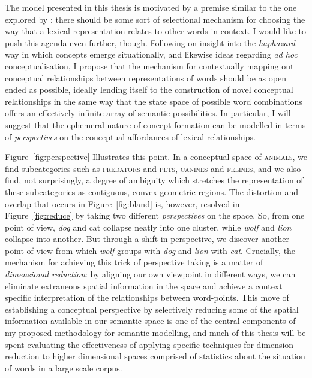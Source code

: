 The model presented in this thesis is motivated by a premise similar to the one explored by \citeauthor{ErkEA2008}: there should be some sort of selectional mechanism for choosing the way that a lexical representation relates to other words in context.  I would like to push this agenda even further, though.  Following on  insight into the \emph{haphazard} way in which concepts emerge situationally, and likewise  ideas regarding \emph{ad hoc} conceptualisation, I propose that the mechanism for contextually mapping out conceptual relationships between representations of words should be as open ended as possible, ideally lending itself to the construction of novel conceptual relationships in the same way that the state space of possible word combinations offers an effectively infinite array of semantic possibilities.  In particular, I will suggest that the ephemeral nature of concept formation can be modelled in terms of \emph{perspectives} on the conceptual affordances of lexical relationships.

Figure~\ref{fig:perspective} Illustrates this point.  In a conceptual space of \textsc{animals}, we find subcategories such as \textsc{predators} and \textsc{pets}, \textsc{canines} and \textsc{felines}, and we also find, not surprisingly, a degree of ambiguity which stretches the representation of these subcategories as contiguous, convex geometric regions.  The distortion and overlap that occurs in Figure~\ref{fig:bland} is, however, resolved in Figure~\ref{fig:reduce} by taking two different \emph{perspectives} on the space.  So, from one point of view, \emph{dog} and cat collapse neatly into one cluster, while \emph{wolf} and \emph{lion} collapse into another.  But through a shift in perspective, we discover another point of view from which \emph{wolf} groups with \emph{dog} and \emph{lion} with \emph{cat}.  Crucially, the mechanism for achieving this trick of perspective taking is a matter of \emph{dimensional reduction}: by aligning our own viewpoint in different ways, we can eliminate extraneous spatial information in the space and achieve a context specific interpretation of the relationships between word-points.  This move of establishing a conceptual perspective by selectively reducing some of the spatial information available in our semantic space is one of the central components of my proposed methodology for semantic modelling, and much of this thesis will be spent evaluating the effectiveness of applying specific techniques for dimension reduction to higher dimensional spaces comprised of statistics about the situation of words in a large scale corpus.

